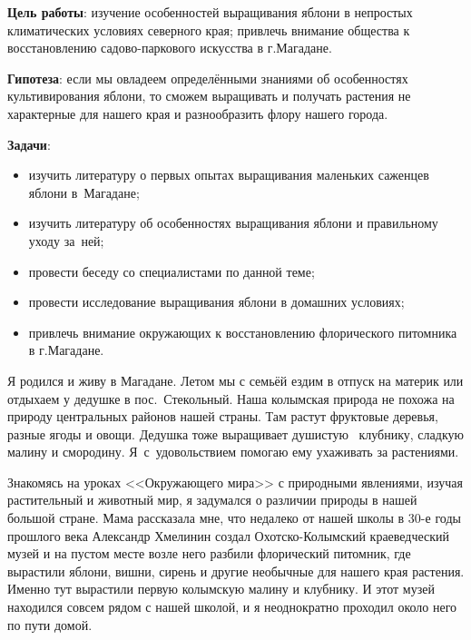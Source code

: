 \bigskip
{}



\makeProcTitleSchool


\textbf{Цель работы}: изучение особенностей выращивания яблони в непростых климатических условиях северного края; привлечь внимание общества к восстановлению садово-паркового искусства в г.Магадане.

\textbf{Гипотеза}: если мы овладеем определёнными знаниями об особенностях культивирования яблони, то сможем выращивать и получать растения не характерные для нашего края и разнообразить флору нашего города.

\textbf{Задачи}:

\begin{itemize}[noitemsep]\vspace{-8pt}
\item изучить литературу о первых опытах выращивания маленьких саженцев яблони в~Магадане;
\item изучить литературу об особенностях выращивания яблони и правильному уходу за~ней;
\item провести беседу со специалистами по данной теме;
\item провести исследование  выращивания яблони в домашних условиях;
\item привлечь внимание окружающих к восстановлению флорического питомника в г.Ма\-га\-да\-не.
\end{itemize}\vspace{-8pt}

Я родился и живу в Магадане. Летом мы с семьёй ездим в отпуск на материк или отдыхаем у дедушке в пос.~Стекольный. Наша колымская природа не похожа на природу центральных районов нашей страны. Там растут фруктовые деревья, разные ягоды и овощи. Дедушка тоже выращивает душистую  клубнику, сладкую малину и смородину. Я~с~удовольствием помогаю ему ухаживать за растениями.

Знакомясь на уроках <<Окружающего мира>> с природными явлениями, изучая растительный и животный мир, я задумался о различии природы в нашей большой стране. Мама рассказала мне, что недалеко от нашей школы в 30-е годы прошлого века Александр Хмелинин создал Охотско-Колымский краеведческий музей и на пустом месте возле него разбили флорический питомник, где вырастили яблони, вишни, сирень и другие необычные для нашего края растения. Именно тут вырастили первую колымскую малину и клубнику. И этот музей находился совсем рядом с нашей школой, и я неоднократно проходил около него по пути домой.

